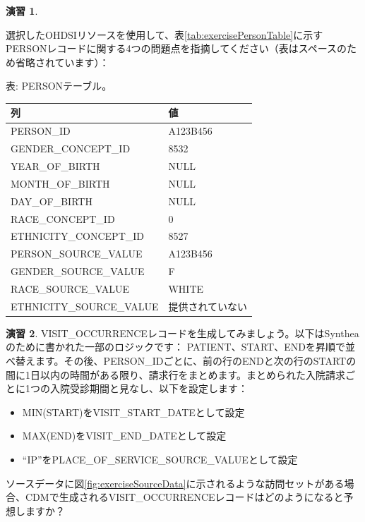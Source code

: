 \documentclass[
  11pt]{book}
\providecommand{\tightlist}{%
  \setlength{\itemsep}{0pt}\setlength{\parskip}{0pt}}
\theoremstyle{definition}
\theoremstyle{definition}
\theoremstyle{definition}
\newtheorem{exercise}{演習}[chapter]
\theoremstyle{definition}
\theoremstyle{remark}
\begin{document}
\begin{exercise}
\protect\hypertarget{exr:exerciseEtl2}{}\label{exr:exerciseEtl2}

選択したOHDSIリソースを使用して、表\ref{tab:exercisePersonTable}に示すPERSONレコードに関する4つの問題点を指摘してください（表はスペースのため省略されています）：

表: \label{tab:exercisePersonTable} PERSONテーブル。

\begin{longtable}[]{@{}ll@{}}
\toprule\noalign{}
列 & 値 \\
\midrule\noalign{}
\endhead
\bottomrule\noalign{}
\endlastfoot
PERSON\_ID & A123B456 \\
GENDER\_CONCEPT\_ID & 8532 \\
YEAR\_OF\_BIRTH & NULL \\
MONTH\_OF\_BIRTH & NULL \\
DAY\_OF\_BIRTH & NULL \\
RACE\_CONCEPT\_ID & 0 \\
ETHNICITY\_CONCEPT\_ID & 8527 \\
PERSON\_SOURCE\_VALUE & A123B456 \\
GENDER\_SOURCE\_VALUE & F \\
RACE\_SOURCE\_VALUE & WHITE \\
ETHNICITY\_SOURCE\_VALUE & 提供されていない \\
\end{longtable}

\end{exercise}

\begin{exercise}
\protect\hypertarget{exr:exerciseEtl3}{}\label{exr:exerciseEtl3}VISIT\_OCCURRENCEレコードを生成してみましょう。以下はSyntheaのために書かれた一部のロジックです：
PATIENT、START、ENDを昇順で並べ替えます。その後、PERSON\_IDごとに、前の行のENDと次の行のSTARTの間に1日以内の時間がある限り、請求行をまとめます。まとめられた入院請求ごとに1つの入院受診期間と見なし、以下を設定します：

\begin{itemize}
\tightlist
\item
  MIN(START)をVISIT\_START\_DATEとして設定
\item
  MAX(END)をVISIT\_END\_DATEとして設定
\item
  ``IP''をPLACE\_OF\_SERVICE\_SOURCE\_VALUEとして設定
\end{itemize}

ソースデータに図\ref{fig:exerciseSourceData}に示されるような訪問セットがある場合、CDMで生成されるVISIT\_OCCURRENCEレコードはどのようになると予想しますか？
\end{exercise}
\end{document}
